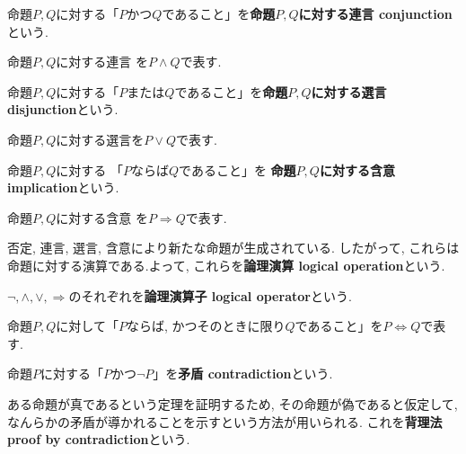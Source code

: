 \begin{Def}
命題$P,Q$に対する「$P$かつ$Q$であること」を{\bf 命題$P,Q$に対する連言 conjunction}という.
\end{Def}
\begin{Notation}
命題$P,Q$に対する連言
を$P\land Q$で表す.
\end{Notation}
\begin{Def}
命題$P,Q$に対する「$P$または$Q$であること」を{\bf 命題$P,Q$に対する選言 disjunction}という.
\end{Def}
\begin{Notation}
命題$P,Q$に対する選言を$P\lor Q$で表す.
\end{Notation}
\begin{Def}
命題$P,Q$に対する
「$P$ならば$Q$であること」を
{\bf 命題$P,Q$に対する含意 implication}という.
\end{Def}
\begin{Notation}
命題$P,Q$に対する含意
を$P\Rightarrow Q$で表す.
\end{Notation}
\begin{caution}
否定, 連言, 選言, 含意により新たな命題が生成されている. したがって, これらは命題に対する演算である.よって, これらを{\bf 論理演算 logical operation}という.
\end{caution}
\begin{caution}
$\lnot,\land,\lor,\Rightarrow$のそれぞれを{\bf 論理演算子 logical operator}という.
\end{caution}
\begin{Notation}
命題$P,Q$に対して「$P$ならば, かつそのときに限り$Q$であること」を$P\Leftrightarrow Q$で表す.\end{Notation}
\begin{Def}
命題$P$に対する「$P$かつ$\lnot P$」を{\bf 矛盾 contradiction}という.
\end{Def}
\begin{caution}
ある命題が真であるという定理を証明するため, その命題が偽であると仮定して, なんらかの矛盾が導かれることを示すという方法が用いられる. これを{\bf 背理法 proof by contradiction}という.
\end{caution}
